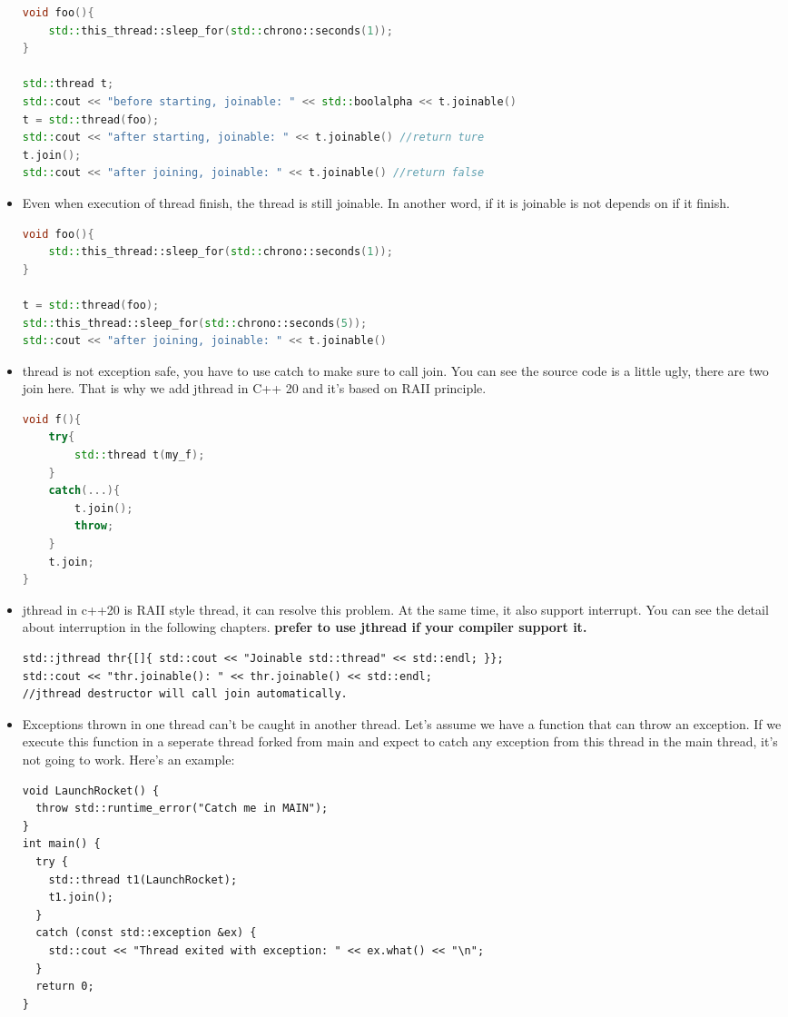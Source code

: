 \documentclass[a4paper,11pt,twoside]{book}
\begin{document}
\begin{itemize}
\begin{lstlisting}[frame=single, language=c++]
void foo(){
	std::this_thread::sleep_for(std::chrono::seconds(1));
}

std::thread t;
std::cout << "before starting, joinable: " << std::boolalpha << t.joinable()
t = std::thread(foo);
std::cout << "after starting, joinable: " << t.joinable() //return ture 
t.join();
std::cout << "after joining, joinable: " << t.joinable() //return false
\end{lstlisting}


	\item Even when execution of thread finish, the thread is still joinable.  In another word, if it is joinable is not depends on if it finish.

\begin{lstlisting}[frame=single, language=c++]
void foo(){
	std::this_thread::sleep_for(std::chrono::seconds(1));
}

t = std::thread(foo);
std::this_thread::sleep_for(std::chrono::seconds(5));
std::cout << "after joining, joinable: " << t.joinable() 
\end{lstlisting}

	\item thread is not exception safe, you have to use catch to make sure to call join. You can see the source code is a little ugly, there are two join here. That is why we add jthread in C++ 20 and it's based on RAII principle. 

\begin{lstlisting}[frame=single, language=c++]
void f(){
	try{
		std::thread t(my_f);
	}
	catch(...){
		t.join();
		throw;
	}
	t.join;
}
\end{lstlisting}

	\item jthread in c++20 is RAII style thread, it can resolve this problem. At the same time, it also support interrupt. You can see the detail about interruption in the following chapters.  \textbf{prefer to use jthread if your compiler support it.} 
\begin{lstlisting}
std::jthread thr{[]{ std::cout << "Joinable std::thread" << std::endl; }};
std::cout << "thr.joinable(): " << thr.joinable() << std::endl;
//jthread destructor will call join automatically.
\end{lstlisting}

	\item Exceptions thrown in one thread can't be caught in another thread. Let's assume we have a function that can throw an exception. If we execute this function in a seperate thread forked from main and expect to catch any exception from this thread in the main thread, it's not going to work. Here's an example:
\begin{lstlisting}[]
void LaunchRocket() {
  throw std::runtime_error("Catch me in MAIN");
}
int main() {
  try {
    std::thread t1(LaunchRocket);
    t1.join();
  }
  catch (const std::exception &ex) {
    std::cout << "Thread exited with exception: " << ex.what() << "\n";
  }
  return 0;
}
\end{lstlisting}


\end{itemize}
\end{document}
